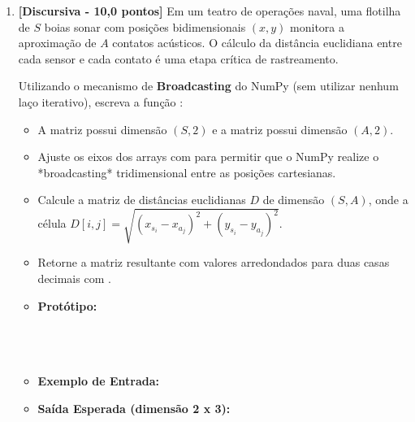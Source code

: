 \begin{enumerate}[label=\textbf{Q\arabic*.}]


\vspace{0.5cm}

\item \textbf{[Discursiva - 10,0 pontos]} Em um teatro de operações naval, uma flotilha de $S$ boias sonar com posições bidimensionais $(x, y)$ monitora a aproximação de $A$ contatos acústicos. O cálculo da distância euclidiana entre cada sensor e cada contato é uma etapa crítica de rastreamento.

Utilizando o mecanismo de \textbf{Broadcasting} do NumPy (sem utilizar nenhum laço iterativo), escreva a função :
\begin{itemize}[leftmargin=*]
    \item A matriz  possui dimensão $(S, 2)$ e a matriz  possui dimensão $(A, 2)$.
    \item Ajuste os eixos dos arrays com  para permitir que o NumPy realize o *broadcasting* tridimensional entre as posições cartesianas.
    \item Calcule a matriz de distâncias euclidianas $D$ de dimensão $(S, A)$, onde a célula $D[i, j] = \sqrt{(x_{s_i} - x_{a_j})^2 + (y_{s_i} - y_{a_j})^2}$.
    \item Retorne a matriz resultante com valores arredondados para duas casas decimais com .
\end{itemize}

\begin{itemize}[leftmargin=*]
    \item \textbf{Protótipo:}\newline
    \\\\\\\\
    \item \textbf{Exemplo de Entrada:}\newline
    \newline
    \newline
    \item \textbf{Saída Esperada (dimensão 2 x 3):}\newline
    \code{array([[ 5.  ,  6.  ,  8.  ],}\newline
    \code{       [ 6.71,  4.  , 12.81]])}
\end{itemize}


\end{enumerate}
